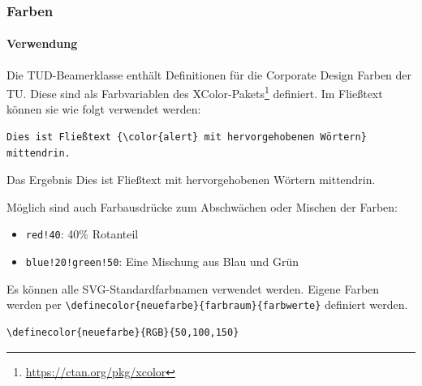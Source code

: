 \documentclass[german,notoc]{tudbeamer}%
\begin{document}
\begin{frame}[fragile]
	\frametitle{Farben}
	\framesubtitle{Verwendung}

	Die TUD-Beamerklasse enthält Definitionen für die Corporate Design Farben der TU. Diese sind als Farbvariablen des XColor-Pakets\footnote{\url{https://ctan.org/pkg/xcolor}} definiert.
	Im Fließtext können sie wie folgt verwendet werden:	
	\begin{lstlisting}[gobble=4,style=latex,numbers=none]
		Dies ist Fließtext {\color{alert} mit hervorgehobenen Wörtern} mittendrin. 
	\end{lstlisting} 
	\begin{block}{Das Ergebnis}
	Dies ist Fließtext {\color{alert} mit hervorgehobenen Wörtern} mittendrin. 
	\end{block}
	Möglich sind auch Farbausdrücke zum Abschwächen oder Mischen der Farben: 
	\begin{itemize}
		\item \texttt{red!40}: 40\% Rotanteil
		\item \texttt{blue!20!green!50}: Eine Mischung aus Blau und Grün
	\end{itemize}
	Es können alle SVG-Standardfarbnamen verwendet werden. Eigene Farben werden per \texttt{\textbackslash definecolor\{neuefarbe\}\{farbraum\}\{farbwerte\}} definiert werden.
	\begin{lstlisting}[gobble=4,style=latex,numbers=none]
		\definecolor{neuefarbe}{RGB}{50,100,150}
	\end{lstlisting} 
\end{frame}
\end{document}
